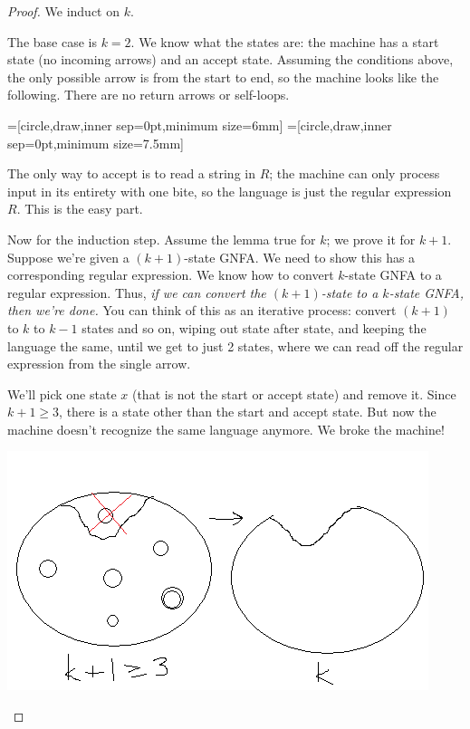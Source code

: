 \begin{proof}
We induct on $k$. 

The base case is $k=2$. We know what the states are: the machine has a start state (no incoming arrows) and an accept state. Assuming the conditions above, the only possible arrow is from the start to end, so the machine looks like the following. There are no return arrows or self-loops.

=[circle,draw,inner sep=0pt,minimum size=6mm]
=[circle,draw,inner sep=0pt,minimum size=7.5mm]
\begin{center}
\end{center}

The only way to accept is to read a string in $R$; the machine can only process input in its entirety with one bite, so the language is just the regular expression $R$. This is the easy part.

Now for the induction step. Assume the lemma true for $k$; we prove it for $k+1$. Suppose we're given a $(k+1)$-state GNFA. We need to show this has a corresponding regular expression. We know how to convert $k$-state GNFA to a regular expression. Thus, {\it if we can convert the $(k+1)$-state to a $k$-state GNFA,  then we're done.} You can think of this as an iterative process: convert $(k+1)$ to $k$ to $k-1$ states and so on, wiping out state after state, and keeping the language the same, until we get to just 2 states, where we can read off the regular expression from the single arrow. 

We'll pick one state $x$ (that is not the start or accept state) and remove it. Since $k+1\ge 3$, there is a state other than the start and accept state. But now the machine doesn't recognize the same language anymore. We broke the machine! 

\begin{center}
\includegraphics[scale=0.5]{3-4}
\end{center}


\end{proof}
